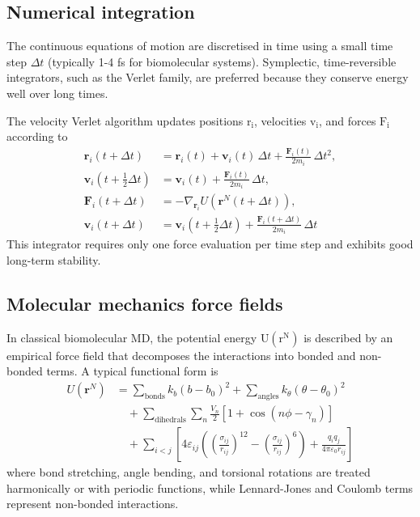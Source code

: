 \documentclass[12pt]{article}
\begin{document}
\subsection{Numerical integration}

The continuous equations of motion are discretised in time using a small time step $\Delta t$ (typically 1-4 fs for biomolecular systems). Symplectic, time-reversible integrators, such as the Verlet family\cite {CH9_verlet1967computer}, are preferred because they conserve energy well over long times\cite{CH9_FrenkelSmit2023}.

The velocity Verlet algorithm updates positions $\textrm{r}_\textrm{i}$, velocities $\textrm{v}_\textrm{i}$, and forces $\textrm{F}_\textrm{i}$ according to
\begin{align}
\mathbf{r}_i(t+\Delta t) &= \mathbf{r}_i(t) + \mathbf{v}_i(t)\,\Delta t + \frac{\mathbf{F}_i(t)}{2m_i}\,\Delta t^2, \\
\mathbf{v}_i(t+\tfrac{1}{2}\Delta t) &= \mathbf{v}_i(t) + \frac{\mathbf{F}_i(t)}{2m_i}\,\Delta t, \\
\mathbf{F}_i(t+\Delta t) &= -\nabla_{\mathbf{r}_i} U(\mathbf{r}^N(t+\Delta t)), \\
\mathbf{v}_i(t+\Delta t) &= \mathbf{v}_i(t+\tfrac{1}{2}\Delta t) + \frac{\mathbf{F}_i(t+\Delta t)}{2m_i}\,\Delta t
\label{eq:motionintegrate}
\end{align}
This integrator requires only one force evaluation per time step and exhibits good long-term stability.

\subsection{Molecular mechanics force fields}

In classical biomolecular MD, the potential energy $\textrm{U}(\textrm{r}^\textrm{N})$ is described by an empirical force field that decomposes the interactions into bonded and non-bonded terms\cite{CH9_Cornell1995,CH9_MacKerell1998}. 
A typical functional form is
\begin{align}
U(\mathbf{r}^N) &= \sum_{\textrm{bonds}} k_b (b - b_0)^2
+ \sum_{\textrm{angles}} k_\theta (\theta - \theta_0)^2 \nonumber \\
&\quad + \sum_{\text{dihedrals}} \sum_n \frac{V_n}{2} \left[1 + \cos(n\phi - \gamma_n)\right] \nonumber\\
&\quad + \sum_{i<j} \left[4\varepsilon_{ij} \left( \left(\frac{\sigma_{ij}}{r_{ij}}\right)^{12} - \left(\frac{\sigma_{ij}}{r_{ij}}\right)^6 \right)
+ \frac{q_i q_j}{4\pi\varepsilon_0 r_{ij}} \right]
\label{eq:empFF}
\end{align}
where bond stretching, angle bending, and torsional rotations are treated harmonically or with periodic functions, while Lennard-Jones and Coulomb terms represent non-bonded interactions. 
\end{document}

